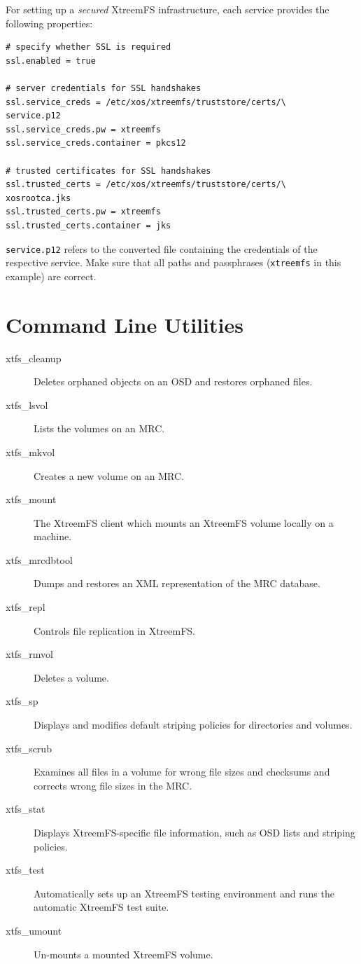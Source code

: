 \documentclass[a4paper,10pt]{book}
\begin{document}
For setting up a \textit{secured} XtreemFS infrastructure, each service provides the following properties:


\begin{verbatim}
# specify whether SSL is required
ssl.enabled = true

# server credentials for SSL handshakes
ssl.service_creds = /etc/xos/xtreemfs/truststore/certs/\
service.p12
ssl.service_creds.pw = xtreemfs
ssl.service_creds.container = pkcs12

# trusted certificates for SSL handshakes
ssl.trusted_certs = /etc/xos/xtreemfs/truststore/certs/\
xosrootca.jks
ssl.trusted_certs.pw = xtreemfs
ssl.trusted_certs.container = jks
\end{verbatim}

\texttt{service.p12} refers to the converted file containing the credentials of the respective service. Make sure that all paths and passphrases (\texttt{xtreemfs} in this example) are correct.



\chapter{Command Line Utilities}

\begin{description}
 \item[xtfs\_cleanup] Deletes orphaned objects on an OSD and restores orphaned files.
 \item[xtfs\_lsvol] Lists the volumes on an MRC.
 \item[xtfs\_mkvol] Creates a new volume on an MRC.
 \item[xtfs\_mount] The XtreemFS client which mounts an XtreemFS volume locally on a machine.
 \item[xtfs\_mrcdbtool] Dumps and restores an XML representation of the MRC database.
 \item[xtfs\_repl] Controls file replication in XtreemFS.
 \item[xtfs\_rmvol] Deletes a volume.
 \item[xtfs\_sp] Displays and modifies default striping policies for directories and volumes.
 \item[xtfs\_scrub] Examines all files in a volume for wrong file sizes and checksums and corrects wrong file sizes in the MRC.
 \item[xtfs\_stat] Displays XtreemFS-specific file information, such as OSD lists and striping policies.
 \item[xtfs\_test] Automatically sets up an XtreemFS testing environment and runs the automatic XtreemFS test suite.
 \item[xtfs\_umount] Un-mounts a mounted XtreemFS volume.
\end{description}

\printindex
\end{document}
